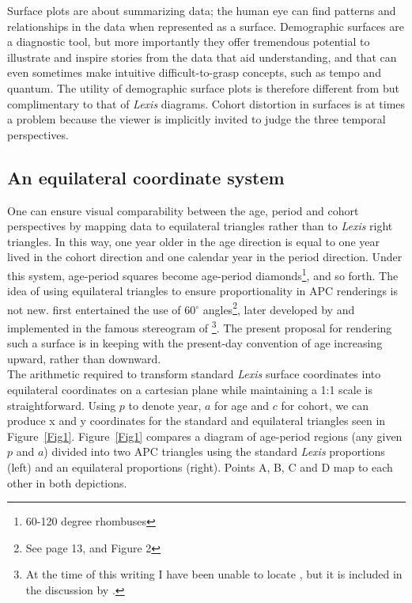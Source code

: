\documentclass[a4paper]{article}
\begin{document}
Surface plots are about summarizing data; the human eye can find patterns and relationships in the data when represented as a surface. Demographic surfaces are a diagnostic tool, but more importantly they offer tremendous potential to illustrate and inspire stories from the data that aid understanding, and that can even sometimes make intuitive difficult-to-grasp concepts, such as tempo and quantum. The utility of demographic surface plots is therefore different from but complimentary to that of \textit{Lexis} diagrams. Cohort distortion in surfaces is at times a problem because the viewer is implicitly invited to judge the three temporal perspectives.

\subsection*{An equilateral coordinate system}
One can ensure visual comparability between the age, period and cohort perspectives by mapping data to equilateral triangles rather than to \textit{Lexis} right triangles. In this way, one year older in the age direction is equal to one year lived in the cohort direction and one calendar year in the period direction. Under this system, age-period squares become age-period diamonds\footnote{60-120 degree rhombuses}, and so forth. The idea of using equilateral triangles to ensure proportionality in APC renderings is not new. \citet{lexis1875einleitung} first entertained the use of 60$^\circ$ angles\footnote{See \citet{lexis1875einleitung} page 13, and Figure 2}, later developed by \citet{lewin1876rapport} and implemented in the famous stereogram of \citet{perozzo1880della}\footnote{At the time of this writing I have been unable to locate \citet{lewin1876rapport}, but it is included in the discussion by \citet{keiding2011age}.}. The present proposal for rendering such a surface is in keeping with the present-day convention of age increasing upward, rather than downward.\\

The arithmetic required to transform standard \textit{Lexis} surface coordinates into equilateral coordinates on a cartesian plane while maintaining a 1:1 scale is straightforward. Using $p$ to denote year, $a$ for age and $c$ for cohort, we can produce x and y coordinates for the standard and equilateral triangles seen in Figure~\ref{Fig1}. Figure~\ref{Fig1} compares a diagram of age-period regions (any given $p$ and $a$) divided into two APC triangles using the standard \textit{Lexis} proportions (left) and an equilateral proportions (right). Points A, B, C and D map to each other in both depictions.\\
\end{document}

